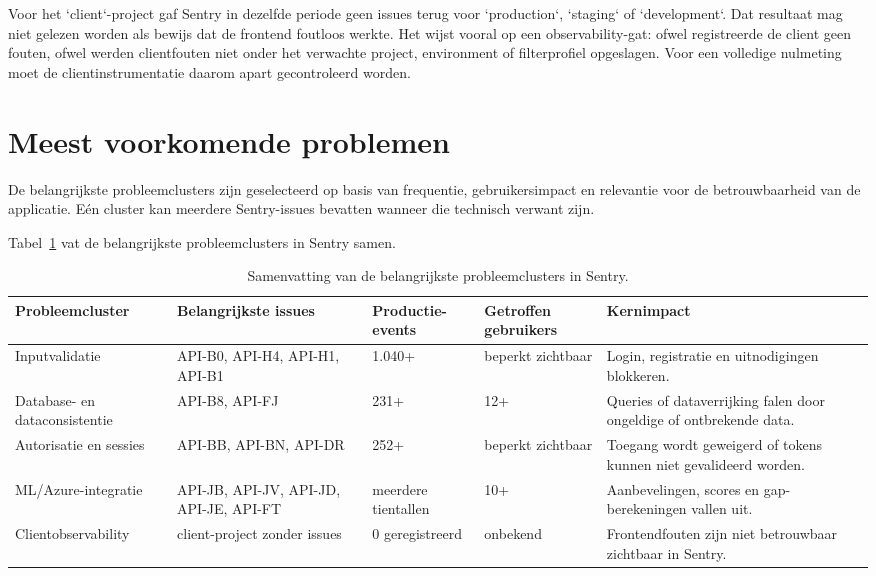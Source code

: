 Voor het `client`-project gaf Sentry in dezelfde periode geen issues terug voor `production`, `staging` of `development`. Dat resultaat mag niet gelezen worden als bewijs dat de frontend foutloos werkte. Het wijst vooral op een observability-gat: ofwel registreerde de client geen fouten, ofwel werden clientfouten niet onder het verwachte project, environment of filterprofiel opgeslagen. Voor een volledige nulmeting moet de clientinstrumentatie daarom apart gecontroleerd worden.

\section{Meest voorkomende problemen}

De belangrijkste probleemclusters zijn geselecteerd op basis van frequentie, gebruikersimpact en relevantie voor de betrouwbaarheid van de applicatie. Eén cluster kan meerdere Sentry-issues bevatten wanneer die technisch verwant zijn.

Tabel~\ref{tab:sentry-probleemclusters} vat de belangrijkste probleemclusters in Sentry samen.

\begin{table}[H]
    \centering
    \caption{Samenvatting van de belangrijkste probleemclusters in Sentry.}
    \label{tab:sentry-probleemclusters}
    \begin{tabular}{p{} p{} p{} p{} p{}}
        \toprule
        Probleemcluster & Belangrijkste issues & Productie-events & Getroffen gebruikers & Kernimpact \\
        \midrule
        Inputvalidatie & API-B0, API-H4, API-H1, API-B1 & 1.040+ & beperkt zichtbaar & Login, registratie en uitnodigingen blokkeren. \\
        Database- en dataconsistentie & API-B8, API-FJ & 231+ & 12+ & Queries of dataverrijking falen door ongeldige of ontbrekende data. \\
        Autorisatie en sessies & API-BB, API-BN, API-DR & 252+ & beperkt zichtbaar & Toegang wordt geweigerd of tokens kunnen niet gevalideerd worden. \\
        ML/Azure-integratie & API-JB, API-JV, API-JD, API-JE, API-FT & meerdere tientallen & 10+ & Aanbevelingen, scores en gap-berekeningen vallen uit. \\
        Clientobservability & client-project zonder issues & 0 geregistreerd & onbekend & Frontendfouten zijn niet betrouwbaar zichtbaar in Sentry. \\
        \bottomrule
    \end{tabular}
\end{table}

